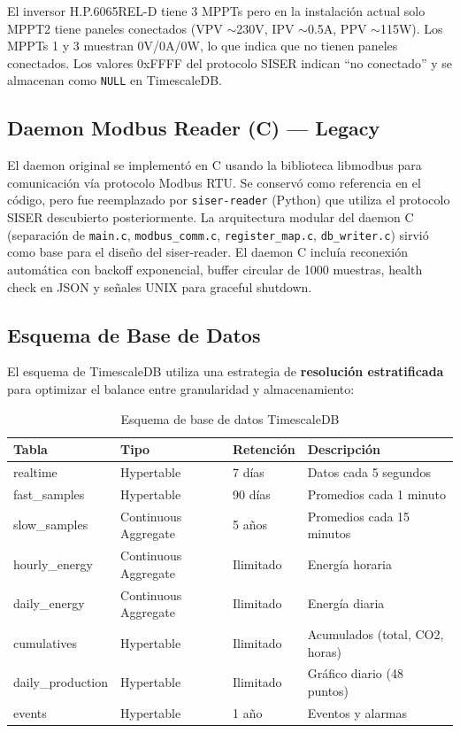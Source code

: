 \documentclass[12pt,a4paper]{article}
\begin{document}
\begin{notebox}
El inversor H.P.6065REL-D tiene 3 MPPTs pero en la instalaci\'on actual solo MPPT2 tiene paneles conectados (VPV $\sim$230V, IPV $\sim$0.5A, PPV $\sim$115W). Los MPPTs 1 y 3 muestran 0V/0A/0W, lo que indica que no tienen paneles conectados. Los valores 0xFFFF del protocolo SISER indican ``no conectado'' y se almacenan como \texttt{NULL} en TimescaleDB.
\end{notebox}

\subsection{Daemon Modbus Reader (C) --- Legacy}

El daemon original se implement\'o en C usando la biblioteca libmodbus para comunicaci\'on v\'ia protocolo Modbus RTU. Se conserv\'o como referencia en el c\'odigo, pero fue reemplazado por \texttt{siser-reader} (Python) que utiliza el protocolo SISER descubierto posteriormente. La arquitectura modular del daemon C (separaci\'on de \texttt{main.c}, \texttt{modbus\_comm.c}, \texttt{register\_map.c}, \texttt{db\_writer.c}) sirvi\'o como base para el dise\~no del siser-reader. El daemon C inclu\'ia reconexi\'on autom\'atica con backoff exponencial, buffer circular de 1000 muestras, health check en JSON y se\~nales UNIX para graceful shutdown.

\subsection{Esquema de Base de Datos}

El esquema de TimescaleDB utiliza una estrategia de \textbf{resoluci\'on estratificada} para optimizar el balance entre granularidad y almacenamiento:

\begin{table}[H]
\centering
\begin{tabular}{llll}
\toprule
\textbf{Tabla} & \textbf{Tipo} & \textbf{Retenci\'on} & \textbf{Descripci\'on} \\
\midrule
realtime & Hypertable & 7 d\'ias & Datos cada 5 segundos \\
fast\_samples & Hypertable & 90 d\'ias & Promedios cada 1 minuto \\
slow\_samples & Continuous Aggregate & 5 a\~nos & Promedios cada 15 minutos \\
hourly\_energy & Continuous Aggregate & Ilimitado & Energ\'ia horaria \\
daily\_energy & Continuous Aggregate & Ilimitado & Energ\'ia diaria \\
cumulatives & Hypertable & Ilimitado & Acumulados (total, CO2, horas) \\
daily\_production & Hypertable & Ilimitado & Gr\'afico diario (48 puntos) \\
events & Hypertable & 1 a\~no & Eventos y alarmas \\
\bottomrule
\end{tabular}
\caption{Esquema de base de datos TimescaleDB}
\end{table}
\end{document}
